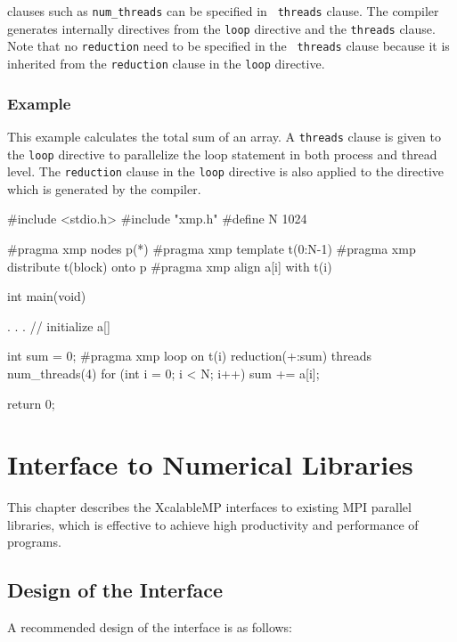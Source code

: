    {\OMP} clauses such as {\tt num\_threads} can be specified in {\tt
   threads} clause.
   The {\XMP} compiler generates internally {\OMP} directives from the
   {\tt loop} directive and the {\tt threads} clause.
   Note that no {\tt reduction} need to be specified in the {\tt
   threads} clause because it is inherited from the {\tt reduction}
   clause in the {\tt loop} directive.

\subsection*{Example}

   This example calculates the total sum of an array.
   A {\tt threads} clause is given to the {\tt loop} directive to
   parallelize the loop statement in both process and
   thread level. 
   The {\tt reduction} clause in the {\tt loop} directive is also
   applied to the {\OMP} directive which is generated by the {\XMP}
   compiler.

\begin{XCexample}
#include <stdio.h>
#include "xmp.h"
#define N 1024

#pragma xmp nodes p(*)
#pragma xmp template t(0:N-1)
#pragma xmp distribute t(block) onto p
#pragma xmp align a[i] with t(i)

int main(void) {
  . . . // initialize a[]

  int sum = 0;
#pragma xmp loop on t(i) reduction(+:sum) threads num_threads(4)
  for (int i = 0; i < N; i++) {
    sum += a[i];
  }

  return 0;
}
\end{XCexample}


\chapter{Interface to Numerical Libraries}
\label{chap:Interface to Numerical Libraries}

   This chapter describes the XcalableMP interfaces to existing MPI
   parallel libraries, which is effective to achieve high productivity
   and performance of {\XMP} programs.
   
\section{Design of the Interface}

A recommended design of the interface is as follows:

